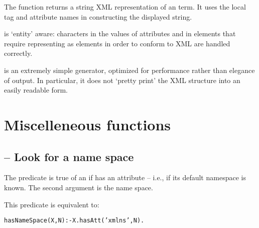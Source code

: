 The  function returns a string XML representation of an  term. It uses the local tag and attribute names in constructing the displayed string.

 is `entity' aware: characters in the values of attributes and in  elements that require representing as elements in order to conform to XML are handled correctly.

 is an extremely simple generator, optimized for performance rather than elegance of output. In particular, it does not `pretty print' the XML structure into an easily readable form.

\section{Miscelleneous functions}

\subsection{ -- Look for a name space}

The  predicate is true of an  if has an  attribute -- i.e., if its default namespace is known. The second argument is the name space.

This predicate is equivalent to:
\begin{alltt}
hasNameSpace(X,N) :- X.hasAtt('xmlns',N).
\end{alltt}

